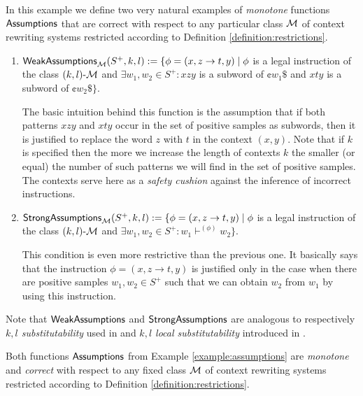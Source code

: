 \begin{example}\label{example:assumptions}
In this example we define two very natural examples of \emph{monotone} functions $\Assumptions$ that are correct with respect to any particular class $\textup{\sf $\mathcal{M}$}$ of context rewriting systems restricted according to Definition \ref{definition:restrictions}.

\begin{enumerate}
\item \index{$\Assumptions$!$\WeakAssumptions$}$\textup{\sf WeakAssumptions}_{\textup{\sf $\mathcal{M}$}}(S^+, k, l) := \{ \phi = (x, z \to t, y) \mid \phi $ is a legal instruction of the class $\textup{\sf $(k,l)$-\textup{\sf $\mathcal{M}$}}$ and $\exists w_1, w_2 \in S^+: xzy$ is a subword of $\cent w_1 \$$ and $xty$ is a subword of $\cent w_2 \$ \}$.

The basic intuition behind this function is the assumption that if both patterns $xzy$ and $xty$ occur in the set of positive samples as subwords, then it is justified to replace the word $z$ with $t$ in the context $(x, y)$. Note that if $k$ is specified then the more we increase the length of contexts $k$ the smaller (or equal) the number of such patterns we will find in the set of positive samples. The contexts serve here as a \emph{safety cushion} against the inference of incorrect instructions.

\item \index{$\Assumptions$!$\StrongAssumptions$}$\textup{\sf StrongAssumptions}_{\textup{\sf $\mathcal{M}$}}(S^+, k, l) := \{ \phi = (x, z \to t, y) \mid \phi $ is a legal instruction of the class $\textup{\sf $(k,l)$-\textup{\sf $\mathcal{M}$}}$ and $\exists w_1, w_2 \in S^+: w_1 \vdash^{(\phi)} w_2\}$.

This condition is even more restrictive than the previous one.
It basically says that the instruction $\phi = (x, z \to t, y)$ is justified only in the
case when there are positive samples $w_1, w_2 \in S^+$ such that we can obtain $w_2$
from $w_1$ by using this instruction.
\end{enumerate}
\end{example}
Note that $\WeakAssumptions$ and $\StrongAssumptions$ are analogous to respectively \emph{$k, l$ substitutability} used in \citep{Yoshinaka2008} and \emph{$k, l$ local substitutability} introduced in \citep{Coste2012}.

\begin{lemma}
Both functions $\Assumptions$ from Example \ref{example:assumptions} are \emph{monotone} and \emph{correct} with respect to any fixed class $\textup{\sf $\mathcal{M}$}$ of context rewriting systems restricted according to Definition \ref{definition:restrictions}.
\end{lemma}


